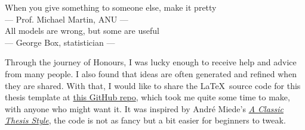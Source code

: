 \thispagestyle{empty}

\vspace*{3cm}
\normalsize
\begin{center}
When you give something to someone else, make it pretty \\ \medskip
--- Prof. Michael Martin, ANU --- \\  
\vspace{1cm}
All models are wrong, but some are useful \\ \medskip
--- George Box, statistician ---
\end{center}

\vspace{2cm}

Through the journey of Honours, I was lucky enough to receive help and advice from many people. I also found that ideas are often generated and refined when they are shared. With that, I would like to share the \LaTeX\ source code for this thesis template at \href{https://github.com/Phuong-Le/honours_thesis}{this GitHub repo}, which took me quite some time to make, with anyone who might want it. It was inspired by André Miede's \href{https://bitbucket.org/amiede/classicthesis/wiki/Home}{\textit{A Classic Thesis Style}}, the code is not as fancy but a bit easier for beginners to tweak.